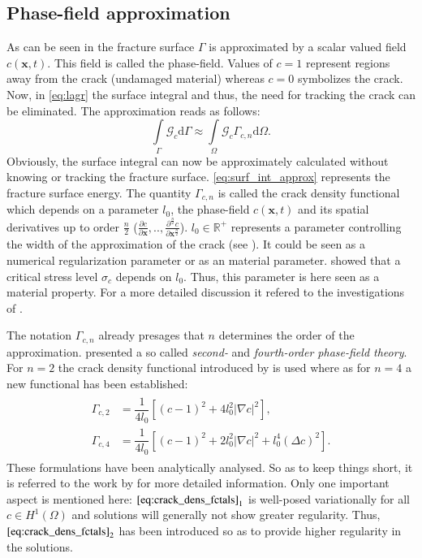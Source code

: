 \subsection{Phase-field approximation} \label{sec:ph_approx}
As can be seen in  the fracture surface $\Gamma$ is approximated by a scalar valued field $c\left(\mathbf{x},t\right)$. This field is called the phase-field. Values of $c=1$ represent regions away from the crack (undamaged material) whereas $c=0$ symbolizes the crack. Now, in \eqref{eq:lagr} the surface integral and thus, the need for tracking the crack can be eliminated. The approximation reads as follows:
\begin{equation} \label{eq:surf_int_approx}
	\int\limits_{\Gamma}\mathcal{G}_{c}\mathrm{d}\Gamma \approx \int\limits_{\Omega}\mathcal{G}_{c}\Gamma_{c,n}\mathrm{d}\Omega.
\end{equation}
Obviously, the surface integral can now be approximately calculated without knowing or tracking the fracture surface. \eqref{eq:surf_int_approx} represents the fracture surface energy. The quantity $\Gamma_{c,n}$ is called the crack density functional which depends on a parameter $l_{0}$, the phase-field $c\left(\mathbf{x},t\right)$ and its spatial derivatives up to order $\frac{n}{2}$ ($\frac{\partial c}{\partial \mathbf{x}},..,\frac{\partial^{\frac{n}{2}} c}{\partial \mathbf{x}^{\frac{n}{2}}}$). $l_{0}\in\mathbb{R}^{+}$ represents a parameter controlling the width of the approximation of the crack (see ). It could be seen as a numerical regularization parameter or as an material parameter. \citet{01_PF_dyn_brittle} showed that a critical stress level $\sigma_{c}$ depends on $l_{0}$. Thus, this parameter is here seen as a material property. For a more detailed discussion it refered to the investigations of \citet{07_PF_l0}.

The notation $\Gamma_{c,n}$ already presages that $n$ determines the order of the approximation. \citet{02_PF_HO_brittle} presented a so called \textit{second-} and \textit{fourth-order phase-field theory}. For $n=2$ the crack density functional introduced by \citet{08_PF_Gammac2} is used where as for $n=4$ a new functional has been established:
\begin{align}
	\begin{aligned}   \label{eq:crack_dens_fctals}
		\Gamma_{c,2} &= \dfrac{1}{4l_{0}}\left[\left(c-1\right)^{2}+4l_{0}^{2}|\nabla c|^{2}\right], \\
		\Gamma_{c,4} &= \dfrac{1}{4l_{0}}\left[\left(c-1\right)^{2}+2l_{0}^{2}|\nabla c|^{2}+l_{0}^{4}\left(\Delta c\right)^{2}\right].
	\end{aligned}
\end{align}
These formulations have been analytically analysed. So as to keep things short, it is referred to the work by \citet{02_PF_HO_brittle} for more detailed information. Only one important aspect is mentioned here: ${\eqref{eq:crack_dens_fctals}}_{1}$ is well-posed variationally for all $c\in H^{1}\left(\Omega\right)$ and solutions will generally not show greater regularity. Thus, ${\eqref{eq:crack_dens_fctals}}_{2}$ has been introduced so as to provide higher regularity in the solutions.

